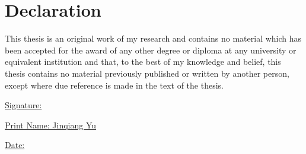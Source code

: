 
\section*{Declaration}

This thesis is an original work of my research and contains no material which has been accepted for the award of any other degree or diploma at any university or equivalent institution and that, to the best of my knowledge and belief, this thesis contains no material previously published or written by another person, except where due reference is made in the text of the thesis.

\vspace{48pt}
\underline{Signature: \hspace{11em}}

\vspace{24pt}
\underline{Print Name: Jinqiang Yu\hspace{4.8em}}

\vspace{24pt}
\underline{Date: \hspace{13.2em}}


